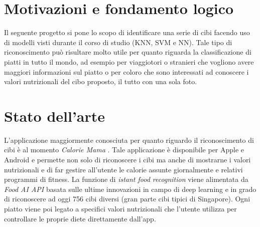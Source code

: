 \documentclass[11pt, a4paper, titlepage]{article}
\begin{document}
\begin{frontespizio}
\Margini{2.5cm}{3cm}{2.5cm}{3cm}
\Sottotitolo{}
\end{frontespizio}
%


\tableofcontents
\newpage

\section{Motivazioni e fondamento logico}
Il seguente progetto si pone lo scopo di identificare una serie di cibi facendo uso di modelli visti durante il corso di studio (KNN, SVM e NN). Tale tipo di riconoscimento può risultare molto utile per quanto riguarda la classificazione di piatti in tutto il mondo, ad esempio per viaggiotori o stranieri che vogliono avere maggiori informazioni sul piatto o per coloro che sono interessati ad conoscere i valori nutrizionali del cibo proposto, il tutto con una sola foto. 

\section{Stato dell'arte}
L'applicazione maggiormente conosciuta per quanto riguardo il riconoscimento di cibi è al momento \emph{Calorie Mama} \cite{calorie-mama}. Tale applicazione è disponibile per Apple e Android e permette non solo di riconoscere i cibi ma anche di mostrarne i valori nutrizionali e di far gestire all'utente le calorie assunte giornalmente e relativi programmi di fitness. La funzione di \textit{istant food recognition} viene alimentata da \textit{Food AI API} \cite{foodai} basata sulle ultime innovazioni in campo di deep learning e in grado di riconoscere ad oggi 756 cibi diversi (gran parte cibi tipici di Singapore). Ogni piatto viene poi legato a specifici valori nutrizionali che l'utente utilizza per controllare le proprie diete direttamente dall'app.
\end{document}
